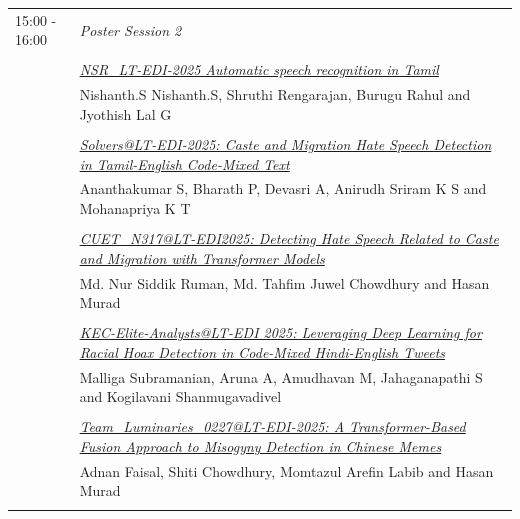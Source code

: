 \documentclass[11pt,oneside]{book}
\begin{document}
\begin{tabular}{p{24mm}p{124mm}}
                        15:00 - 16:00 & \emph{Poster Session 2}\\\\
      
                
                      & \hyperlink{page.95}{\emph{NSR\_LT-EDI-2025 Automatic speech recognition in Tamil}}\\
        & Nishanth.S Nishanth.S\index{Nishanth.S}, Shruthi Rengarajan\index{Rengarajan}, Burugu Rahul\index{Rahul} and Jyothish Lal G\index{G}\\\\
                
                      & \hyperlink{page.100}{\emph{Solvers@LT-EDI-2025: Caste and Migration Hate Speech Detection in Tamil-English Code-Mixed Text}}\\
        & Ananthakumar S\index{S}, Bharath P\index{P}, Devasri A\index{A}, Anirudh Sriram K S\index{S} and Mohanapriya K T\index{T}\\\\
                
                      & \hyperlink{page.105}{\emph{CUET\_N317@LT-EDI2025: Detecting Hate Speech Related to Caste and Migration with Transformer Models}}\\
        & Md. Nur Siddik Ruman\index{Ruman}, Md. Tahfim Juwel Chowdhury\index{Chowdhury} and Hasan Murad\index{Murad}\\\\
                
                      & \hyperlink{page.111}{\emph{KEC-Elite-Analysts@LT-EDI 2025: Leveraging Deep Learning for Racial Hoax Detection in Code-Mixed Hindi-English Tweets}}\\
        & Malliga Subramanian\index{Subramanian}, Aruna A\index{A}, Amudhavan M\index{M}, Jahaganapathi S\index{S} and Kogilavani Shanmugavadivel\index{Shanmugavadivel}\\\\
                
                      & \hyperlink{page.116}{\emph{Team\_Luminaries\_0227@LT-EDI-2025: A Transformer-Based Fusion Approach to Misogyny Detection in Chinese Memes}}\\
        & Adnan Faisal\index{Faisal}, Shiti Chowdhury\index{Chowdhury}, Momtazul Arefin Labib\index{Labib} and Hasan Murad\index{Murad}\\\\
              \end{tabular}
\end{document}
